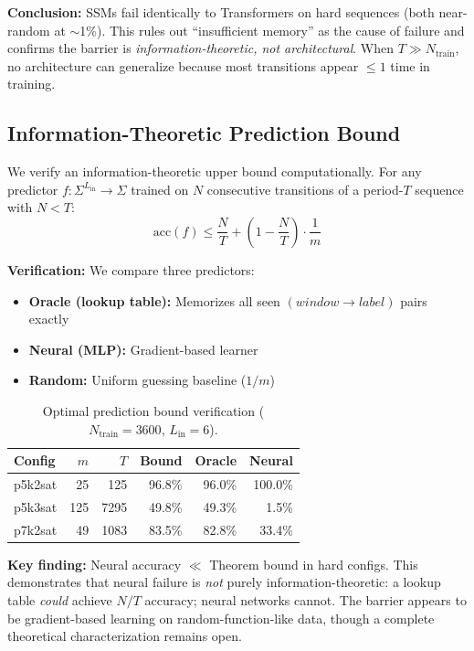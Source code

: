 \documentclass[11pt]{article}
\theoremstyle{plain}
\theoremstyle{definition}
\begin{document}
\textbf{Conclusion:} SSMs fail identically to Transformers on hard sequences (both near-random at $\sim$1\%). This rules out ``insufficient memory'' as the cause of failure and confirms the barrier is \emph{information-theoretic, not architectural}. When $T \gg N_{\mathrm{train}}$, no architecture can generalize because most transitions appear $\leq 1$ time in training.

\subsection{Information-Theoretic Prediction Bound}
\label{sec:results:optimal}

We verify an information-theoretic upper bound computationally. For any predictor $f\colon \Sigma^{L_{\mathrm{in}}} \to \Sigma$ trained on $N$ consecutive transitions of a period-$T$ sequence with $N < T$:
\begin{equation}
\mathrm{acc}(f) \leq \frac{N}{T} + \left(1 - \frac{N}{T}\right) \cdot \frac{1}{m}
\end{equation}

\textbf{Verification:} We compare three predictors:
\begin{itemize}
\item \textbf{Oracle (lookup table):} Memorizes all seen $(window \to label)$ pairs exactly
\item \textbf{Neural (MLP):} Gradient-based learner
\item \textbf{Random:} Uniform guessing baseline ($1/m$)
\end{itemize}

\begin{table}[ht]
\centering
\caption{Optimal prediction bound verification ($N_{\mathrm{train}}=3600$, $L_{\mathrm{in}}=6$).}
\label{tab:optimal_bound}
\medskip
\begin{tabular}{@{}lrrrrr@{}}
\toprule
Config & $m$ & $T$ & Bound & Oracle & Neural\\
\midrule
p5k2sat  & 25  & 125   & 96.8\% & 96.0\% & 100.0\%\\
p5k3sat  & 125 & 7295  & 49.8\% & 49.3\% & 1.5\%\\
p7k2sat  & 49  & 1083  & 83.5\% & 82.8\% & 33.4\%\\
\bottomrule
\end{tabular}
\end{table}

\textbf{Key finding:} Neural accuracy $\ll$ Theorem bound in hard configs. This demonstrates that neural failure is \emph{not} purely information-theoretic: a lookup table \emph{could} achieve $N/T$ accuracy; neural networks cannot. The barrier appears to be gradient-based learning on random-function-like data, though a complete theoretical characterization remains open.
\end{document}
